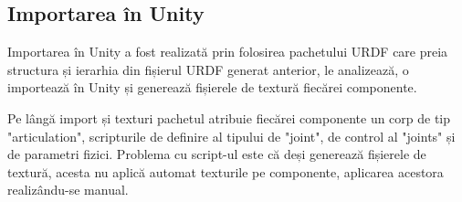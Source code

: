 \subsection{Importarea în Unity}
Importarea în Unity a fost realizată prin folosirea pachetului URDF care preia structura și ierarhia din fișierul URDF generat anterior, le analizează, o importează în Unity și generează fișierele de textură fiecărei componente.

Pe lângă import și texturi pachetul atribuie fiecărei componente un corp de tip "articulation", scripturile de definire al tipului de "joint", de control al "joints" și de parametri fizici. Problema cu script-ul este că deși generează fișierele de textură, acesta nu aplică automat texturile pe componente, aplicarea acestora realizându-se manual.

